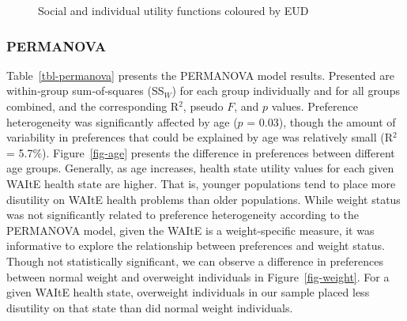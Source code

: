 \documentclass[
  letterpaper,
  DIV=11,
  numbers=noendperiod]{scrartcl}
\begin{document}
\begin{figure}


\caption{\label{fig-eud}Social and individual utility functions coloured
by EUD}

\end{figure}%

\subsubsection{PERMANOVA}\label{permanova}

Table~\ref{tbl-permanova} presents the PERMANOVA model results.
Presented are within‐group sum‐of‐squares (SS\(_W\)) for each group
individually and for all groups combined, and the corresponding R\(^2\),
pseudo \(F\), and \(p\) values. Preference heterogeneity was
significantly affected by age (\(p\) = 0.03), though the amount of
variability in preferences that could be explained by age was relatively
small (R\(^2\) = 5.7\%). Figure~\ref{fig-age} presents the difference in
preferences between different age groups. Generally, as age increases,
health state utility values for each given WAItE health state are
higher. That is, younger populations tend to place more disutility on
WAItE health problems than older populations. While weight status was
not significantly related to preference heterogeneity according to the
PERMANOVA model, given the WAItE is a weight-specific measure, it was
informative to explore the relationship between preferences and weight
status. Though not statistically significant, we can observe a
difference in preferences between normal weight and overweight
individuals in Figure~\ref{fig-weight}. For a given WAItE health state,
overweight individuals in our sample placed less disutility on that
state than did normal weight individuals.
\end{document}
